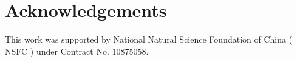 \documentclass[prd, showpacs,nofootinbib,amsmath,amssymb]{revtex4}
\begin{document}

\section*{Acknowledgements}

This work was supported by National Natural Science Foundation of
China ( NSFC ) under Contract No. 10875058.



\end{document}
